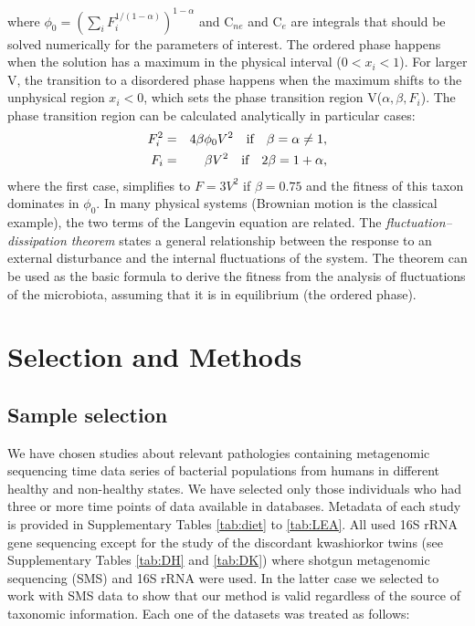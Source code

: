 \documentclass[12pt,oneside,letterpaper]{article}
\begin{document}
where $\phi_0 = (\sum_i F_i^{1/(1-\alpha)})^{1-\alpha}$ and C$_{ne}$ and C$_{e}$ are integrals that should be solved numerically for the parameters of interest. The ordered phase happens when the solution has a maximum in the physical interval ($0<x_i<1$). For larger V, the transition to a disordered phase happens when the maximum shifts to the unphysical region $x_i<0$, which sets the phase transition region V($\alpha,\beta,F_i$). The phase transition region can be calculated analytically in particular cases:
\begin{eqnarray}
F_i^2 &=& 4 \beta \phi_0 V^2\quad \textrm{if} \quad  \beta = \alpha \neq 1, \notag \\
F_i &=& \beta V^2\quad \textrm{if} \quad  2\beta = 1+\alpha,
\notag
\end{eqnarray}
where the first case, simplifies to $F= 3 V^2$ if $\beta = 0.75$ and the fitness of this taxon dominates in $\phi_0$. 
In many physical systems (Brownian motion is the classical example), the two terms of the Langevin equation are related.  The \emph{fluctuation--dissipation theorem} states a general relationship between the response to an external disturbance and the internal fluctuations of the system\cite{FD}. The theorem can be used as the basic formula to derive the fitness from the analysis of fluctuations 
of the microbiota, assuming that it is in equilibrium (the ordered phase).  

\section{Selection and Methods}

\subsection{Sample selection}
We have chosen studies about relevant pathologies containing metagenomic sequencing time data series of bacterial populations from humans in different healthy and non-healthy states. We have selected only those individuals who had three or more time points of data available in databases. Metadata of each study is provided in Supplementary Tables \ref{tab:diet} to \ref{tab:LEA}. All used 16S rRNA gene sequencing except for the study of the discordant kwashiorkor twins\cite{kwashiorkor} (see Supplementary Tables \ref{tab:DH} and \ref{tab:DK}) where shotgun metagenomic sequencing (SMS) and 16S rRNA were used. In the latter case we selected to work with SMS data to show that our method is valid regardless of the source of taxonomic information. Each one of the datasets was treated as follows:
\end{document}
